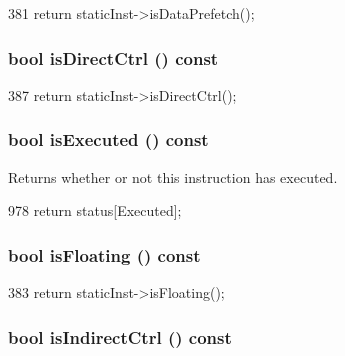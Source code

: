 \begin{DoxyCode}
381 { return staticInst->isDataPrefetch(); }
\end{DoxyCode}
\hypertarget{classInOrderDynInst_ac218ba4230a8cd92999948288a54e14f}{
\subsubsection[{isDirectCtrl}]{\setlength{\rightskip}{0pt plus 5cm}bool isDirectCtrl () const}}
\label{classInOrderDynInst_ac218ba4230a8cd92999948288a54e14f}



\begin{DoxyCode}
387 { return staticInst->isDirectCtrl(); }
\end{DoxyCode}
\hypertarget{classInOrderDynInst_a25d5f6d24c54820fbd19eb0e4e59dcac}{
\subsubsection[{isExecuted}]{\setlength{\rightskip}{0pt plus 5cm}bool isExecuted () const}}
\label{classInOrderDynInst_a25d5f6d24c54820fbd19eb0e4e59dcac}
Returns whether or not this instruction has executed. 


\begin{DoxyCode}
978 { return status[Executed]; }
\end{DoxyCode}
\hypertarget{classInOrderDynInst_a58024ee3f69c53c47ec5b315b78a7302}{
\subsubsection[{isFloating}]{\setlength{\rightskip}{0pt plus 5cm}bool isFloating () const}}
\label{classInOrderDynInst_a58024ee3f69c53c47ec5b315b78a7302}



\begin{DoxyCode}
383 { return staticInst->isFloating(); }
\end{DoxyCode}
\hypertarget{classInOrderDynInst_a5dfa427a48589c4c910416a67808510f}{
\subsubsection[{isIndirectCtrl}]{\setlength{\rightskip}{0pt plus 5cm}bool isIndirectCtrl () const}}
\label{classInOrderDynInst_a5dfa427a48589c4c910416a67808510f}



